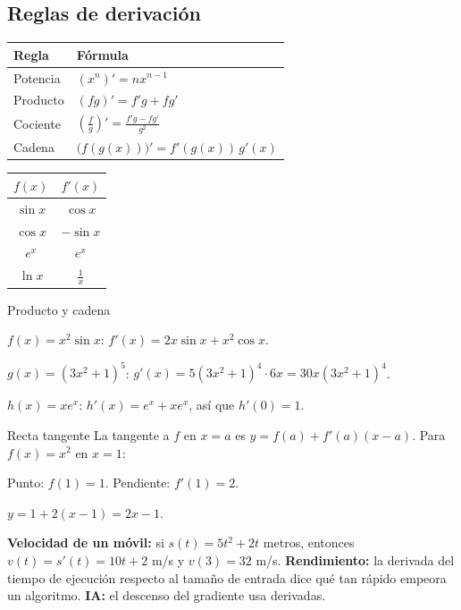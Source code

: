 \subsection{Reglas de derivaci\'on}
\begin{center}
\begin{tabular}{|l|l|}
\hline
\rowcolor{tmAzulClaro}\textbf{Regla} & \textbf{F\'ormula}\\ \hline
Potencia & $(x^n)'=nx^{n-1}$\\ \hline
Producto & $(fg)'=f'g+fg'$\\ \hline
Cociente & $\left(\frac fg\right)'=\frac{f'g-fg'}{g^2}$\\ \hline
Cadena & $\big(f(g(x))\big)'=f'(g(x))\,g'(x)$\\ \hline
\end{tabular}
\hspace{0.6cm}
\begin{tabular}{|c|c|}
\hline
\rowcolor{tmAzulClaro}$f(x)$ & $f'(x)$\\ \hline
$\sin x$ & $\cos x$\\ \hline
$\cos x$ & $-\sin x$\\ \hline
$e^x$ & $e^x$\\ \hline
$\ln x$ & $\frac1x$\\ \hline
\end{tabular}
\end{center}

\begin{tmejemplo}{Producto y cadena}
\begin{tmpasos}
\item $f(x)=x^2\sin x$: $f'(x)=2x\sin x+x^2\cos x$.
\item $g(x)=(3x^2+1)^5$: $g'(x)=5(3x^2+1)^4\cdot6x=30x(3x^2+1)^4$.
\item $h(x)=xe^x$: $h'(x)=e^x+xe^x$, as\'i que $h'(0)=1$.
\end{tmpasos}
\end{tmejemplo}

\begin{tmejemplo}{Recta tangente}
La tangente a $f$ en $x=a$ es $y=f(a)+f'(a)(x-a)$. Para $f(x)=x^2$ en $x=1$:
\begin{tmpasos}
\item Punto: $f(1)=1$. Pendiente: $f'(1)=2$.
\item $y=1+2(x-1)=2x-1$.
\end{tmpasos}
\end{tmejemplo}

\begin{tmsistemas}
\textbf{Velocidad de un m\'ovil:} si $s(t)=5t^2+2t$ metros, entonces $v(t)=s'(t)=10t+2$ m/s y $v(3)=32$ m/s. \textbf{Rendimiento:} la derivada del tiempo de ejecuci\'on respecto al tama\~no de entrada dice qu\'e tan r\'apido empeora un algoritmo. \textbf{IA:} el descenso del gradiente usa derivadas.
\end{tmsistemas}

